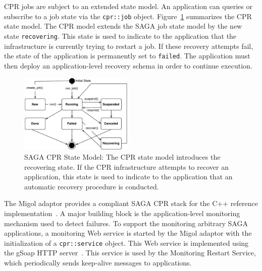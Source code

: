 \documentclass[times, 10pt, twocolumn]{article}
\begin{document}
CPR jobs are subject to an extended state model. An application can queries or subscribe to a job state via the \texttt{cpr::job} object.      
Figure~\ref{fig:cpr-statemodel} summarizes the CPR state model. The CPR model extends the SAGA job state model by the new state \texttt{recovering}. This state
is used to indicate to the application that the infrastructure is currently trying to restart a job. 
If these recovery attempts fail, the state of the application is permanently set to \texttt{failed}. 
The application must then deploy an application-level recovery schema in order to continue execution. 

\begin{figure}[th]
    \centering
        \includegraphics[width=0.48\textwidth]{cpr-statemodel.pdf}
    \caption{SAGA CPR State Model: The CPR state model introduces the recovering state. If the CPR infrastructure attempts to recover an application, this state is used to indicate to the application that an automatic recovery procedure is conducted.}
    \label{fig:cpr-statemodel}
\end{figure}
 

The Migol adaptor provides a compliant SAGA CPR stack for the C++ reference implementation~\cite{Kaiser:2006qp}. 
A major building block is the application-level monitoring mechanism used to detect failures. 
To support the monitoring arbitrary SAGA applications, a monitoring Web service is started 
by the Migol adaptor with the initialization of a \texttt{cpr::service} object. This Web 
service is implemented using the gSoap HTTP server~\cite{gsoap}.  This service is used by the Monitoring Restart Service,
which periodically sends keep-alive messages to applications.                                                                             

\end{document}

